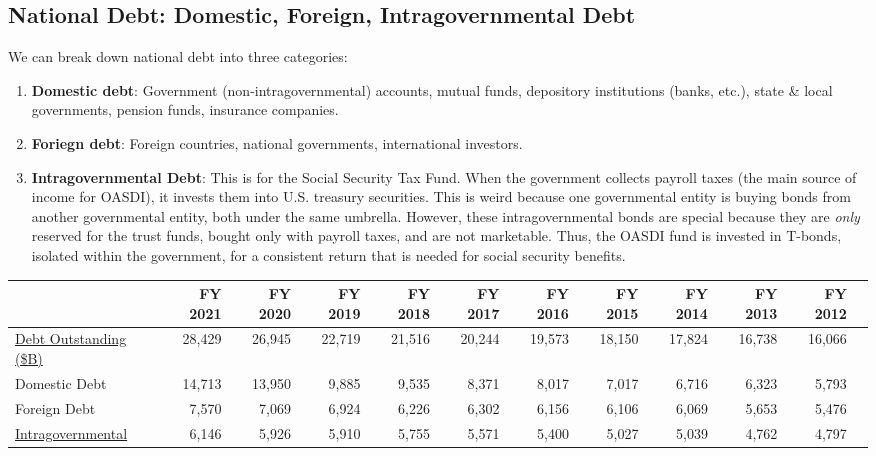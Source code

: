 \documentclass{article}
\begin{document}
  \subsection{National Debt: Domestic, Foreign, Intragovernmental Debt}

    We can break down national debt into three categories:

    \begin{enumerate}
      \item \textbf{Domestic debt}: Government (non-intragovernmental) accounts, mutual funds, depository institutions (banks, etc.), state \& local governments, pension funds, insurance companies.
      \item \textbf{Foriegn debt}: Foreign countries, national governments, international investors.
      \item \textbf{Intragovernmental Debt}: This is for the Social Security Tax Fund. When the government collects payroll taxes (the main source of income for OASDI), it invests them into U.S. treasury securities. This is weird because one governmental entity is buying bonds from another governmental entity, both under the same umbrella. However, these intragovernmental bonds are special because they are \textit{only} reserved for the trust funds, bought only with payroll taxes, and are not marketable. Thus, the OASDI fund is invested in T-bonds, isolated within the government, for a consistent return that is needed for social security benefits.
    \end{enumerate}

    \begin{table}[h]
      \begin{tabular}{lrrrrrrrrrrr}
      \hline
      & FY 2021 & FY 2020 & FY 2019 & FY 2018 & FY 2017 & FY 2016 & FY 2015 & FY 2014 & FY 2013 & FY 2012 \\
      \hline
      \href{https://www.treasurydirect.gov/govt/reports/pd/histdebt/histdebt\_histo5.htm}{Debt Outstanding (\$B)} & 28,429 & 26,945 & 22,719 & 21,516 & 20,244 & 19,573 & 18,150 & 17,824 & 16,738 & 16,066 \\
      Domestic Debt & 14,713 & 13,950 & 9,885 & 9,535 & 8,371 & 8,017 & 7,017 & 6,716 & 6,323 & 5,793 \\
      Foreign Debt & 7,570 & 7,069 & 6,924 & 6,226 & 6,302 & 6,156 & 6,106 & 6,069 & 5,653 & 5,476 \\
      \href{https://fiscaldata.treasury.gov/datasets/debt-to-the-penny/debt-to-the-penny}{Intragovernmental} & 6,146 & 5,926 & 5,910 & 5,755 & 5,571 & 5,400 & 5,027 & 5,039 & 4,762 & 4,797 \\
      \hline
      \end{tabular}
    \end{table}
\end{document}
